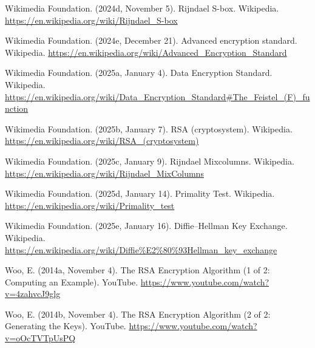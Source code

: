 \documentclass[12pt,a4paper]{report}
\begin{document}
\begin{thebibliography}{99}
Wikimedia Foundation. (2024d, November 5). Rijndael S-box. Wikipedia.
\url{https://en.wikipedia.org/wiki/Rijndael_S-box}
 
Wikimedia Foundation. (2024e, December 21). Advanced encryption standard. Wikipedia.
\url{https://en.wikipedia.org/wiki/Advanced_Encryption_Standard}

Wikimedia Foundation. (2025a, January 4). Data Encryption Standard. Wikipedia.
\url{https://en.wikipedia.org/wiki/Data_Encryption_Standard#The_Feistel_(F)_function}

Wikimedia Foundation. (2025b, January 7). RSA (cryptosystem). Wikipedia.
\url{https://en.wikipedia.org/wiki/RSA_(cryptosystem)}

Wikimedia Foundation. (2025c, January 9). Rijndael Mixcolumns. Wikipedia.
\url{https://en.wikipedia.org/wiki/Rijndael_MixColumns}

Wikimedia Foundation. (2025d, January 14). Primality Test. Wikipedia.
\url{https://en.wikipedia.org/wiki/Primality_test}

Wikimedia Foundation. (2025e, January 16). Diffie–Hellman Key Exchange. Wikipedia.
\url{https://en.wikipedia.org/wiki/Diffie%E2%80%93Hellman_key_exchange}

Woo, E. (2014a, November 4). The RSA Encryption Algorithm (1 of 2: Computing an Example). YouTube.
\url{https://www.youtube.com/watch?v=4zahvcJ9glg}

Woo, E. (2014b, November 4). The RSA Encryption Algorithm (2 of 2: Generating the Keys). YouTube.
\url{https://www.youtube.com/watch?v=oOcTVTpUsPQ}

\end{thebibliography}


\openright
\end{document}
